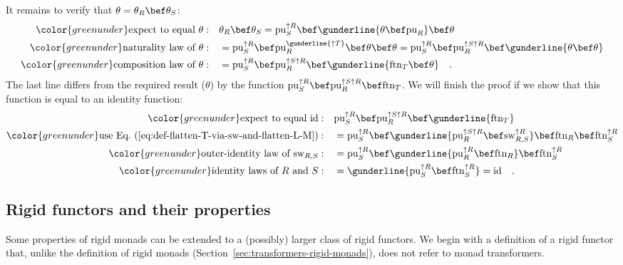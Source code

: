 It remains to verify that $\theta=\theta_{R}\bef\theta_{S}$:
\begin{align*}
{\color{greenunder}\text{expect to equal }\theta:}\quad & \theta_{R}\bef\theta_{S}=\text{pu}_{S}^{\uparrow R}\bef\gunderline{\theta\bef\text{pu}_{R}}\bef\theta\\
{\color{greenunder}\text{naturality law of }\theta:}\quad & =\text{pu}_{S}^{\uparrow R}\bef\text{pu}_{R}^{\gunderline{\uparrow T}}\bef\theta\bef\theta=\text{pu}_{S}^{\uparrow R}\bef\text{pu}_{R}^{\uparrow S\uparrow R}\bef\gunderline{\theta\bef\theta}\\
{\color{greenunder}\text{composition law of }\theta:}\quad & =\text{pu}_{S}^{\uparrow R}\bef\text{pu}_{R}^{\uparrow S\uparrow R}\bef\gunderline{\text{ftn}_{T}\bef\theta}\quad.
\end{align*}
The last line differs from the required result ($\theta$) by the
function $\text{pu}_{S}^{\uparrow R}\bef\text{pu}_{R}^{\uparrow S\uparrow R}\bef\text{ftn}_{T}$.
We will finish the proof if we show that this function is equal to
an identity function:
\begin{align*}
{\color{greenunder}\text{expect to equal }\text{id}:}\quad & \text{pu}_{S}^{\uparrow R}\bef\text{pu}_{R}^{\uparrow S\uparrow R}\bef\gunderline{\text{ftn}_{T}}\\
{\color{greenunder}\text{use Eq.~(\ref{eq:def-flatten-T-via-sw-and-flatten-L-M})}:}\quad & =\text{pu}_{S}^{\uparrow R}\bef\gunderline{\text{pu}_{R}^{\uparrow S\uparrow R}\bef\text{sw}_{R,S}^{\uparrow R}}\bef\text{ftn}_{R}\bef\text{ftn}_{S}^{\uparrow R}\\
{\color{greenunder}\text{outer-identity law of }\text{sw}_{R,S}:}\quad & =\text{pu}_{S}^{\uparrow R}\bef\gunderline{\text{pu}_{R}^{\uparrow R}\bef\text{ftn}_{R}}\bef\text{ftn}_{S}^{\uparrow R}\\
{\color{greenunder}\text{identity laws of }R\text{ and }S:}\quad & =\gunderline{\text{pu}_{S}^{\uparrow R}\bef\text{ftn}_{S}^{\uparrow R}}=\text{id}\quad.
\end{align*}


\subsection{Rigid functors and their properties\label{subsec:Rigid-functors}}

Some properties of rigid monads can be extended to a (possibly) larger
class of rigid functors. We begin with a definition of a rigid functor
that, unlike the definition of rigid monads (Section~\ref{sec:transformers-rigid-monads}),
does not refer to monad transformers.

